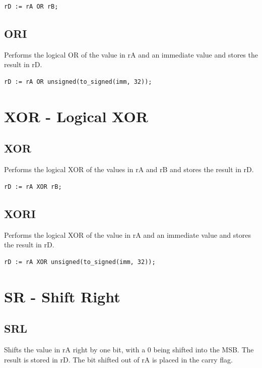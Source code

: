 \documentclass{UoYCSproject}
\begin{document}
\begin{lstlisting}
rD := rA OR rB;
\end{lstlisting}

\subsection{ORI}

Performs the logical OR of the value in rA and an immediate value and stores the result in rD.

\begin{lstlisting}
rD := rA OR unsigned(to_signed(imm, 32));
\end{lstlisting}

\section{XOR - Logical XOR}

\subsection{XOR}

Performs the logical XOR of the values in rA and rB and stores the result in rD.

\begin{lstlisting}
rD := rA XOR rB;
\end{lstlisting}

\subsection{XORI}

Performs the logical XOR of the value in rA and an immediate value and stores the result in rD.

\begin{lstlisting}
rD := rA XOR unsigned(to_signed(imm, 32));
\end{lstlisting}

\section{SR - Shift Right}

\subsection{SRL}

Shifts the value in rA right by one bit, with a 0 being shifted into the MSB. The result is stored in rD.
The bit shifted out of rA is placed in the carry flag.
\end{document}
